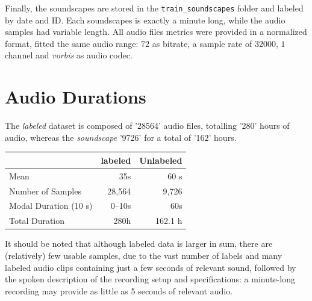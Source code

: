 \documentclass[10pt]{article}
\begin{document}
Finally, the soundscapes are stored in the \texttt{train\_soundscapes} folder and labeled by date and ID. Each soundscapes is exactly a minute long, while the audio samples had variable length. All audio files metrics were provided in a normalized format, fitted the same audio range: $72$ as bitrate, a sample rate of $32000$, $1$ channel and \textit{vorbis} as audio codec.

\section*{Audio Durations}

The \textit{labeled} dataset is composed of '28564' audio files, totalling '280' hours of audio, whereas the \textit{soundscape} '9726' for a total of '162' hours.

\begin{table}[h!]
  \centering
  \begin{tabular}{|l|r|r|}
    \hline
    & \textbf{labeled} & \textbf{Unlabeled} \\
    \hline
    Mean                  & 35s      & 60 s       \\
    Number of Samples      & 28,564   & 9,726      \\
    Modal Duration (10 s)  & 0--10s   & 60s        \\
    Total Duration         & 280h     & 162.1 h    \\
    \hline
  \end{tabular}
\end{table}

It should be noted that although labeled data is larger in sum, there are (relatively) few usable samples, due to the vast number of labels and many labeled audio clips containing just a few seconds of relevant sound, followed by the spoken description of the recording setup and specifications: a minute-long recording may provide as little as 5 seconds of relevant audio. 
\end{document}
